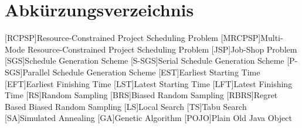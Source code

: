 \chapter{Abkürzungsverzeichnis}

\begin{acronym}
[RCPSP]{Resource-Constrained Project Scheduling Problem}
[MRCPSP]{Multi-Mode Resource-Constrained Project Scheduling Problem}
[JSP]{Job-Shop Problem}
[SGS]{Schedule Generation Scheme}
[S-SGS]{Serial Schedule Generation Scheme}
[P-SGS]{Parallel Schedule Generation Scheme}
[EST]{Earliest Starting Time}
[EFT]{Earliest Finishing Time}
[LST]{Latest Starting Time}
[LFT]{Latest Finishing Time}
[RS]{Random Sampling}
[BRS]{Biased Random Sampling}
[RBRS]{Regret Based Biased Random Sampling}
[LS]{Local Search}
[TS]{Tabu Search}
[SA]{Simulated Annealing}
[GA]{Genetic Algorithm}
[POJO]{Plain Old Java Object}

\end{acronym}